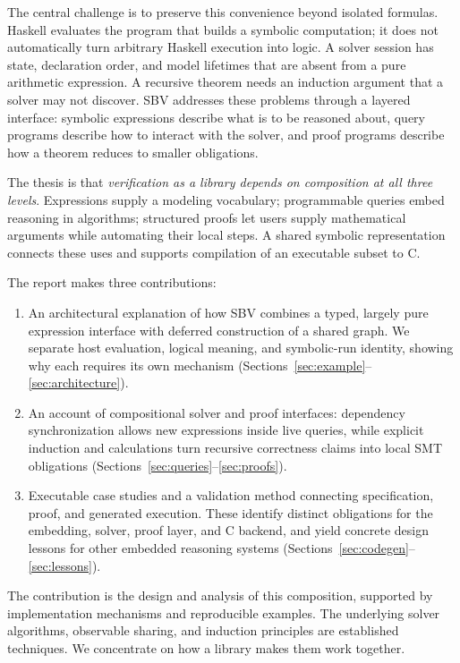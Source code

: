 \documentclass[acmsmall,screen,nonacm]{acmart}
\begin{document}
The central challenge is to preserve this convenience beyond isolated
formulas. Haskell evaluates the program that builds a symbolic computation;
it does not automatically turn arbitrary Haskell execution into logic.
A solver session has state, declaration order, and model lifetimes that are
absent from a pure arithmetic expression. A recursive theorem needs an
induction argument that a solver may not discover. SBV addresses these
problems through a layered interface: symbolic expressions describe what is
to be reasoned about, query programs describe how to interact with the solver,
and proof programs describe how a theorem reduces to smaller obligations.

The thesis is that \emph{verification as a library depends on composition at
all three levels}. Expressions supply a modeling vocabulary; programmable
queries embed reasoning in algorithms; structured proofs let users supply
mathematical arguments while automating their local steps. A shared symbolic
representation connects these uses and supports compilation of an executable
subset to C.

The report makes three contributions:
\begin{enumerate}
\item An architectural explanation of how SBV combines a typed, largely pure
expression interface with deferred construction of a shared graph. We separate
host evaluation, logical meaning, and symbolic-run identity, showing why each
requires its own mechanism (Sections~\ref{sec:example}--\ref{sec:architecture}).
\item An account of compositional solver and proof interfaces: dependency
synchronization allows new expressions inside live queries, while explicit
induction and calculations turn recursive correctness claims into local SMT
obligations (Sections~\ref{sec:queries}--\ref{sec:proofs}).
\item Executable case studies and a validation method connecting specification,
proof, and generated execution. These identify distinct obligations for the
embedding, solver, proof layer, and C backend, and yield concrete design lessons
for other embedded reasoning systems (Sections~\ref{sec:codegen}--\ref{sec:lessons}).
\end{enumerate}
The contribution is the design and analysis of this composition, supported by
implementation mechanisms and reproducible examples. The underlying solver
algorithms, observable sharing, and induction principles are established
techniques. We concentrate on how a library makes them work together.
\end{document}
